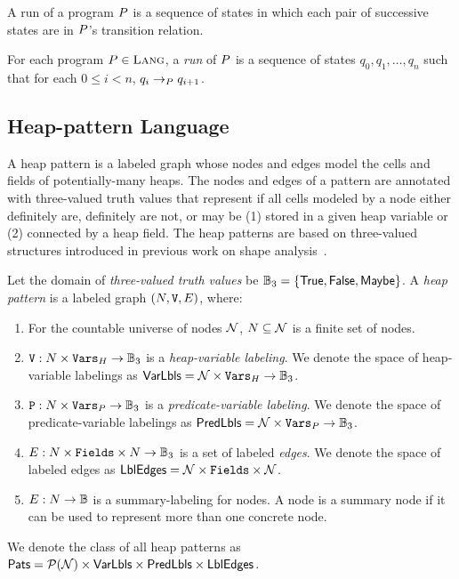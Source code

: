 A run of a program $P$ is a sequence of states in which each
pair of successive states are in $P$'s transition relation.
%
\begin{defn}
  \label{defn:trans-rels}
  For each program $P \in \textsc{Lang}$, a \emph{run} of $P$ is a
  sequence of states $q_0, q_1, \ldots, q_n$ such that for each $0
  \leq i < n$, $q_i \rightarrow_{P} q_{i + 1}$.
\end{defn}


\subsection{Heap-pattern Language}
\label{sec:patterns}
A heap pattern is a labeled graph whose nodes and edges model the
cells and fields of potentially-many heaps.
%
The nodes and edges of a pattern are annotated with three-valued truth
values that represent if all cells modeled by a node either definitely
are, definitely are not, or may be (1) stored in a given heap variable
or (2) connected by a heap field.
%
The heap patterns are based on three-valued structures introduced in
previous work on shape analysis~\cite{sagiv02}.
%
\begin{defn}
  \label{defn:pattern}
  Let the domain of \emph{three-valued truth values} be $\mathbb{B}_3 =
  \{ \mathsf{True}, \mathsf{False}, \mathsf{Maybe} \}$.
  A \emph{heap pattern} is a labeled graph $(N, \mathtt{V},
  E)$, where:
  \begin{enumerate}
  \item
    For the countable universe of nodes $\mathcal{N}$, $N
    \subseteq \mathcal{N}$ is a finite set of nodes.
  \item
    $\mathtt{V}: N \times \mathtt{Vars}_H \to \mathbb{B}_3$ is a
    \emph{heap-variable labeling}.
    We denote the space of heap-variable labelings as $\mathsf{VarLbls} =
    \mathcal{N} \times \mathtt{Vars}_H \to \mathbb{B}_3$.
  \item
    $\mathtt{P}: N \times \mathtt{Vars}_P \to \mathbb{B}_3$ is a
    \emph{predicate-variable labeling}.
    We denote the space of predicate-variable labelings as $\mathsf{PredLbls} =
    \mathcal{N} \times \mathtt{Vars}_P \to \mathbb{B}_3$.
  \item
    $E: N \times \mathtt{Fields} \times N \to \mathbb{B}_3$ is a set of
    labeled \emph{edges}.
    We denote the space of labeled edges as $\mathsf{LblEdges} = \mathcal{N}
    \times \mathtt{Fields} \times \mathcal{N}$.
  \item
    $E: N \to \mathbb{B}$ is a summary-labeling for nodes. A node is a summary node if it can be used to represent more than one concrete node.
  \end{enumerate}
  We denote the class of all heap patterns as $\mathsf{Pats} =
  \mathcal{P}(\mathcal{N}) \times \mathsf{VarLbls} \times \mathsf{PredLbls} \times \mathsf{LblEdges}$.
\end{defn}

